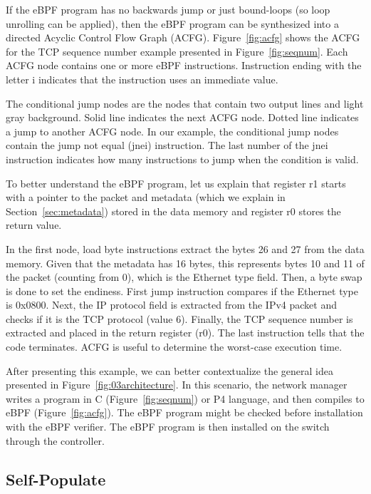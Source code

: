 If the eBPF program has no backwards jump or just bound-loops (so loop unrolling can be applied), then the eBPF program can be synthesized into a directed Acyclic Control Flow Graph (ACFG). 
Figure~\ref{fig:acfg} shows the ACFG for the TCP sequence number example presented in Figure~\ref{fig:seqnum}. Each ACFG node contains one or more eBPF instructions. Instruction ending with the letter i indicates that the instruction uses an immediate value.

The conditional jump nodes are the nodes that contain two output lines and light gray background.
Solid line indicates the next ACFG node. Dotted line indicates a jump to another ACFG node.
In our example, the conditional jump nodes contain the jump not equal (jnei) instruction.
The last number of the jnei instruction indicates how many instructions to jump when the condition is valid.

To better understand the eBPF program, let us explain that register r1 starts with a pointer to the packet and metadata (which we explain in Section~\ref{sec:metadata}) stored in the data memory and register r0 stores the return value.

In the first node, load byte instructions extract the bytes 26 and 27 from the data memory.
Given that the metadata has 16 bytes, this represents bytes 10 and 11 of the packet (counting from 0), which is the Ethernet type field. Then, a byte swap is done to set the endiness. 
First jump instruction compares if the Ethernet type is 0x0800. Next, the IP protocol field is extracted from the IPv4 packet and checks if it is the TCP protocol (value 6). Finally, the TCP sequence number is extracted and placed in the return register (r0). The last instruction tells that the code terminates.
ACFG is useful to determine the worst-case execution time.




After presenting this example, we can better contextualize the general idea presented in  Figure~\ref{fig:03architecture}. In this scenario, the network manager writes a program in C (Figure~\ref{fig:seqnum}) or P4 language, and then compiles to eBPF (Figure~\ref{fig:acfg}). The eBPF program might be checked before installation with the eBPF verifier. The eBPF program is then installed on the switch through the controller.


\subsection{Self-Populate}
\label{sec:selfpopulate}

